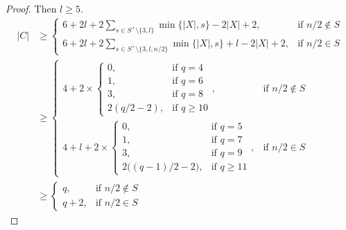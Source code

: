 \documentclass{article}
\begin{document}
\begin{proof}
Then $l \ge 5$.
\begin{align*}
|C| &\geq 
\begin{cases}
\displaystyle 6 + 2l+2\sum_{s\in S^+\setminus\{3,l\}} \min\{|X|,s\}-2|X|+2, & \text{if } n/2\notin S \\[4pt]
\displaystyle 6 +2l+ 2\sum_{s\in S^+\setminus\{3,l,n/2\}} \min\{|X|,s\}+ l-2|X|+2, & \text{if } n/2\in S
\end{cases} \\
&\geq 
\begin{cases}
\displaystyle 4 + 2\times
\begin{cases}
0, & \text{if } q=4 \\
1, & \text{if } q=6 \\
3, & \text{if } q=8 \\
2(q/2-2), & \text{if } q\ge 10
\end{cases}, & \text{if } n/2\notin S \\[4pt]
\displaystyle 4+ l + 2\times
\begin{cases}
0, & \text{if } q=5 \\
1, & \text{if } q=7 \\
3, & \text{if } q=9 \\
2\big((q-1)/2-2\big), & \text{if } q\ge 11
\end{cases}, & \text{if } n/2\in S
\end{cases} \\
&\geq 
\begin{cases}
\displaystyle q, & \text{if } n/2\notin S \\[4pt]
\displaystyle q+2, & \text{if } n/2\in S
\end{cases}
\end{align*}


\end{proof}
\end{document}
